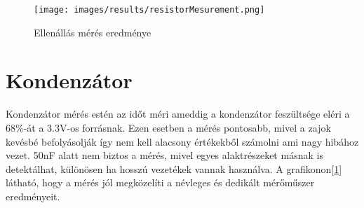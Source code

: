     \begin{figure}[H]
        \centering
        \texttt{[image: images/results/resistorMesurement.png]}
        \caption{Ellenállás mérés eredménye}
        \label{fig:ResistorResults}
    \end{figure}


\section{Kondenzátor}

Kondenzátor mérés estén az időt méri ameddig a kondenzátor feszültsége eléri a 
68\%-át a 3.3V-os forrásnak. Ezen esetben a mérés pontosabb, mivel
a zajok kevésbé befolyásolják így nem kell alacsony értékekből
számolni ami nagy hibához vezet. 50nF alatt nem biztos a mérés, 
mivel egyes alaktrészeket másnak is detektálhat, különösen ha 
hosszú vezetékek vannak használva. A grafikonon[\ref{fig:ResistorResults}]
látható, hogy a mérés jól megközelíti a névleges és dedikált mérőműszer
eredményeit.

